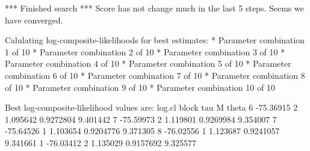 \begin{Schunk}
\begin{Soutput}
*** Finished search *** 
Score has not change much in the last 5 steps. 
Seems we have converged. 

Calulating log-composite-likelihoods for best estimates: 
* Parameter combination 1 of 10 
* Parameter combination 2 of 10 
* Parameter combination 3 of 10 
* Parameter combination 4 of 10 
* Parameter combination 5 of 10 
* Parameter combination 6 of 10 
* Parameter combination 7 of 10 
* Parameter combination 8 of 10 
* Parameter combination 9 of 10 
* Parameter combination 10 of 10 


Best log-composite-likelihood values are: 
     log.cl block      tau         M    theta
6 -75.36915     2 1.095642 0.9272804 9.401442
7 -75.59973     2 1.119801 0.9269984 9.354007
7 -75.64526     1 1.103654 0.9204776 9.371305
8 -76.02556     1 1.123687 0.9241057 9.341661
1 -76.03412     2 1.135029 0.9157692 9.325577
\end{Soutput}
\end{Schunk}

